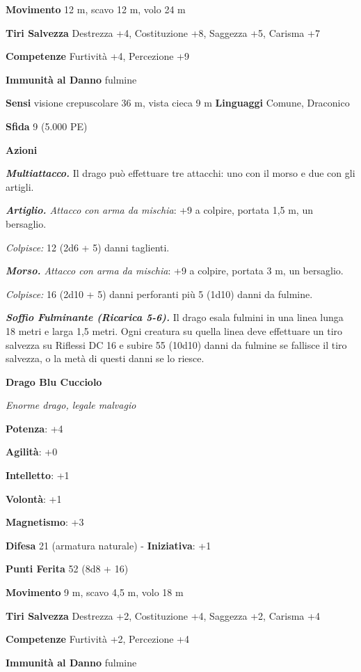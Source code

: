 \begin{multicols}{2}
\textbf{Movimento} 12 m, scavo 12 m, volo 24 m

\textbf{Tiri Salvezza} Destrezza +4, Costituzione +8, Saggezza +5,
Carisma +7

\textbf{Competenze} Furtività +4, Percezione +9

\textbf{Immunità al Danno} fulmine

\textbf{Sensi} visione crepuscolare 36 m, vista cieca 9 m
\textbf{Linguaggi} Comune, Draconico

\textbf{Sfida} 9 (5.000 PE)

\textbf{Azioni}

\emph{\textbf{Multiattacco.}} Il drago può effettuare tre attacchi: uno
con il morso e due con gli artigli.

\emph{\textbf{Artiglio.} Attacco con arma da mischia}: +9 a colpire,
portata 1,5 m, un bersaglio.

\emph{Colpisce:} 12 (2d6 + 5) danni taglienti.

\emph{\textbf{Morso.} Attacco con arma da mischia}: +9 a colpire,
portata 3 m, un bersaglio.

\emph{Colpisce:} 16 (2d10 + 5) danni perforanti più 5 (1d10) danni da
fulmine.

\emph{\textbf{Soffio Fulminante (Ricarica 5-6).}} Il drago esala fulmini
in una linea lunga 18 metri e larga 1,5 metri. Ogni creatura su quella
linea deve effettuare un tiro salvezza su Riflessi DC 16 e subire 55
(10d10) danni da fulmine se fallisce il tiro salvezza, o la metà di
questi danni se lo riesce.

\textbf{Drago Blu Cucciolo}

\emph{Enorme drago, legale malvagio}

\textbf{Potenza}: +4

\textbf{Agilità}: +0

\textbf{Intelletto}: +1

\textbf{Volontà}: +1

\textbf{Magnetismo}: +3

\textbf{Difesa} 21 (armatura naturale) - \textbf{Iniziativa}: +1

\textbf{Punti Ferita} 52 (8d8 + 16)

\textbf{Movimento} 9 m, scavo 4,5 m, volo 18 m

\textbf{Tiri Salvezza} Destrezza +2, Costituzione +4, Saggezza +2,
Carisma +4

\textbf{Competenze} Furtività +2, Percezione +4

\textbf{Immunità al Danno} fulmine


\end{multicols}
